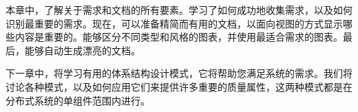本章中，了解关于需求和文档的所有要素。学习了如何成功地收集需求，以及如何识别最重要的需求。现在，可以准备精简而有用的文档，以面向视图的方式显示哪些内容是重要的。能够区分不同类型和风格的图表，并使用最适合需求的图表。最后，能够自动生成漂亮的文档。

下一章中，将学习有用的体系结构设计模式，它将帮助您满足系统的需求。我们将讨论各种模式，以及如何应用它们来提供许多重要的质量属性，这两种模式都是在分布式系统的单组件范围内进行。
